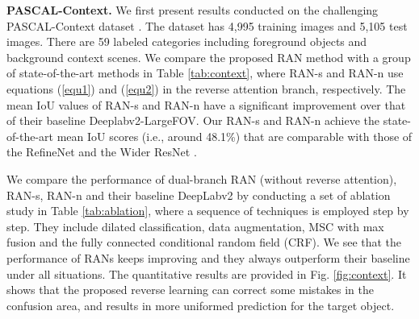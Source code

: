 \documentclass[runningheads]{llncs}
\begin{document}
\begin{table*}[t]
\centering
{}
\caption{Ablation study of different RANs on the PASCAL-Context
dataset to evaluate the benefit of proposed RAN. We compare the results under different network set-up with employing dilated decision conv filters, 
data augmentation, the MSC design and the CRF post-processing.}
\label{tab:ablation}
\end{table*}
{\bf PASCAL-Context.} We first present results conducted on the
challenging PASCAL-Context dataset \cite{mottaghi2014role}. The dataset
has 4,995 training images and 5,105 test images. There are 59 labeled
categories including foreground objects and background context scenes.
We compare the proposed RAN method with a group of state-of-the-art
methods in Table \ref{tab:context}, where RAN-s and RAN-n use
equations (\ref{equ1}) and (\ref{equ2}) in the reverse attention branch,
respectively.  The mean IoU values of RAN-s and RAN-n have a significant improvement
over that of their baseline Deeplabv2-LargeFOV. Our
RAN-s and RAN-n achieve the state-of-the-art mean IoU scores (i.e.,
around 48.1\%) that are comparable with those of the RefineNet
\cite{lin2016refinenet} and the Wider ResNet \cite{wu2016wider}. 





We compare the performance of dual-branch RAN (without reverse attention), RAN-s, RAN-n and their baseline DeepLabv2 by conducting a
set of ablation study in Table \ref{tab:ablation}, where a sequence of
techniques is employed step by step. They include dilated classification,
data augmentation, MSC with max fusion and the fully connected conditional random field
(CRF). We see that the performance of RANs keeps improving and they
always outperform their baseline under all situations.  The quantitative
results are provided in Fig.  \ref{fig:context}. It shows that the
proposed reverse learning can correct some mistakes in the confusion
area, and results in more uniformed prediction for the target object. 
 
\end{document}
